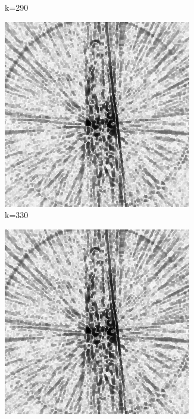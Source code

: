 \documentclass[journal]{IEEEtran}
\begin{document}
\begin{figure}[h]
\begin{subfigure}[b]{0.24\linewidth}
        \caption{k=290}
     \end{subfigure}
  \begin{subfigure}[b]{0.24\linewidth}
        \includegraphics[width=\textwidth]{../images/okra/2D_okra/weightsIm_330normalized.png}
        \caption{k=330}
     \end{subfigure}
   \begin{subfigure}[b]{0.24\linewidth}
        \includegraphics[width=\textwidth]{../images/okra/2D_okra/weightsIm_370normalized.png}

\end{subfigure}
\end{figure}
\end{document}
